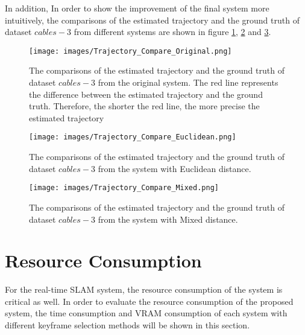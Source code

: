 In addition, In order to show the improvement of the final system more intuitively, the comparisons of the estimated trajectory and the ground truth of dataset $cables-3$ from different systems are shown in figure \ref{Trajectory_Compare_Original}, \ref{Trajectory_Compare_Euclidean} and \ref{Trajectory_Compare_Mixed}.
\begin{figure}[thb]
    \centering
    \texttt{[image: images/Trajectory\_Compare\_Original.png]}
    \caption[The comparisons of the estimated trajectory and the ground truth of dataset $cables-3$ from the original system]{The comparisons of the estimated trajectory and the ground truth of dataset $cables-3$ from the original system. The red line represents the difference between the estimated trajectory and the ground truth. Therefore, the shorter the red line, the more precise the estimated trajectory}\label{Trajectory_Compare_Original}
\end{figure}
\begin{figure}[thb]
    \centering
    \texttt{[image: images/Trajectory\_Compare\_Euclidean.png]}
    \caption[The comparisons of the estimated trajectory and the ground truth of dataset $cables-3$ from the system with Euclidean distance]{The comparisons of the estimated trajectory and the ground truth of dataset $cables-3$ from the system with Euclidean distance.}\label{Trajectory_Compare_Euclidean}
\end{figure}
\begin{figure}[thb]
    \centering
    \texttt{[image: images/Trajectory\_Compare\_Mixed.png]}
    \caption[The comparisons of the estimated trajectory and the ground truth of dataset $cables-3$ from the system with Mixed distance]{The comparisons of the estimated trajectory and the ground truth of dataset $cables-3$ from the system with Mixed distance.}\label{Trajectory_Compare_Mixed}
\end{figure}

\section{Resource Consumption}
For the real-time SLAM system, the resource consumption of the system is critical as well. In order to evaluate the resource consumption of the proposed system, the time consumption and \ac{VRAM} consumption of each system with different keyframe selection methods will be shown in this section.
